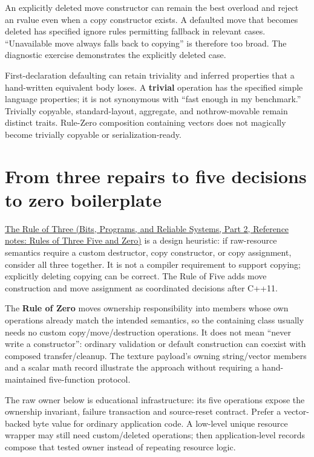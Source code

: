 An explicitly deleted move constructor can remain the best overload and reject an rvalue even when a copy constructor exists. A defaulted move that becomes deleted has specified ignore rules permitting fallback in relevant cases. ``Unavailable move always falls back to copying'' is therefore too broad. The diagnostic exercise demonstrates the explicitly deleted case.

First-declaration defaulting can retain triviality and inferred properties that a hand-written equivalent body loses. A \textbf{trivial} operation has the specified simple language properties; it is not synonymous with ``fast enough in my benchmark.'' Trivially copyable, standard-layout, aggregate, and nothrow-movable remain distinct traits. Rule-Zero composition containing vectors does not magically become trivially copyable or serialization-ready.

\section{From three repairs to five decisions to zero boilerplate}\label{05-engine-i-ch003-from-three-repairs-to-five-decisions-to-zero-boilerplate}

\hypertarget{05-engine-i-ch003-from-three-repairs-to-five-decisions-to-zero-boilerplate}{}

\href{../01-Bits-Programs-and-Reliable-Systems-P02/main.pdf\#nameddest=appendix-7679107d057e}{The Rule of Three (Bits, Programs, and Reliable Systems, Part 2, Reference notes: Rules of Three Five and Zero)} is a design heuristic: if raw-resource semantics require a custom destructor, copy constructor, or copy assignment, consider all three together. It is not a compiler requirement to support copying; explicitly deleting copying can be correct. The Rule of Five adds move construction and move assignment as coordinated decisions after C++11.

The \textbf{Rule of Zero} moves ownership responsibility into members whose own operations already match the intended semantics, so the containing class usually needs no custom copy/move/destruction operations. It does not mean ``never write a constructor'': ordinary validation or default construction can coexist with composed transfer/cleanup. The texture payload's owning string/vector members and a scalar math record illustrate the approach without requiring a hand-maintained five-function protocol.

The raw owner below is educational infrastructure: its five operations expose the ownership invariant, failure transaction and source-reset contract. Prefer a vector-backed byte value for ordinary application code. A low-level unique resource wrapper may still need custom/deleted operations; then application-level records compose that tested owner instead of repeating resource logic.

